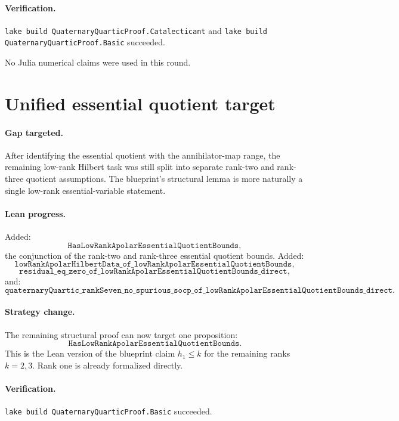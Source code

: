 \documentclass[11pt]{article}
\begin{document}
\paragraph{Verification.}
\texttt{lake build QuaternaryQuarticProof.Catalecticant} and
\texttt{lake build QuaternaryQuarticProof.Basic} succeeded.

No Julia numerical claims were used in this round.

\section*{Unified essential quotient target}

\paragraph{Gap targeted.}
After identifying the essential quotient with the annihilator-map range, the
remaining low-rank Hilbert task was still split into separate rank-two and
rank-three quotient assumptions.  The blueprint's structural lemma is more
naturally a single low-rank essential-variable statement.

\paragraph{Lean progress.}
Added:
\[
\texttt{HasLowRankApolarEssentialQuotientBounds},
\]
the conjunction of the rank-two and rank-three essential quotient bounds.
Added:
\[
\texttt{lowRankApolarHilbertData\_of\_lowRankApolarEssentialQuotientBounds},
\]
\[
\texttt{residual\_eq\_zero\_of\_lowRankApolarEssentialQuotientBounds\_direct},
\]
and:
\[
\texttt{quaternaryQuartic\_rankSeven\_no\_spurious\_socp\_of\_lowRankApolarEssentialQuotientBounds\_direct}.
\]

\paragraph{Strategy change.}
The remaining structural proof can now target one proposition:
\[
\texttt{HasLowRankApolarEssentialQuotientBounds}.
\]
This is the Lean version of the blueprint claim \(h_1\le k\) for the remaining
ranks \(k=2,3\).  Rank one is already formalized directly.

\paragraph{Verification.}
\texttt{lake build QuaternaryQuarticProof.Basic} succeeded.
\end{document}
